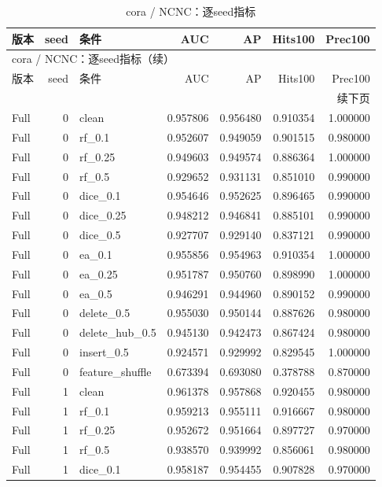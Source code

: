 \documentclass[UTF8,a4paper,11pt,fontset=fandol]{ctexart}
\begin{document}
{\footnotesize
\setlength{\tabcolsep}{3pt}
\begin{longtable}{lrlrrrr}
\caption{cora / NCNC：逐seed指标}\\
\toprule
版本 & seed & 条件 & AUC & AP & Hits100 & Prec100 \\
\midrule
\endfirsthead
\multicolumn{7}{l}{cora / NCNC：逐seed指标（续）}\\
\toprule
版本 & seed & 条件 & AUC & AP & Hits100 & Prec100 \\
\midrule
\endhead
\midrule\multicolumn{7}{r}{续下页}\\
\endfoot
\bottomrule\endlastfoot
Full & 0 & clean & 0.957806 & 0.956480 & 0.910354 & 1.000000 \\
Full & 0 & rf\_0.1 & 0.952607 & 0.949059 & 0.901515 & 0.980000 \\
Full & 0 & rf\_0.25 & 0.949603 & 0.949574 & 0.886364 & 1.000000 \\
Full & 0 & rf\_0.5 & 0.929652 & 0.931131 & 0.851010 & 0.990000 \\
Full & 0 & dice\_0.1 & 0.954646 & 0.952625 & 0.896465 & 0.990000 \\
Full & 0 & dice\_0.25 & 0.948212 & 0.946841 & 0.885101 & 0.990000 \\
Full & 0 & dice\_0.5 & 0.927707 & 0.929140 & 0.837121 & 0.990000 \\
Full & 0 & ea\_0.1 & 0.955856 & 0.954963 & 0.910354 & 1.000000 \\
Full & 0 & ea\_0.25 & 0.951787 & 0.950760 & 0.898990 & 1.000000 \\
Full & 0 & ea\_0.5 & 0.946291 & 0.944960 & 0.890152 & 0.990000 \\
Full & 0 & delete\_0.5 & 0.955030 & 0.950144 & 0.887626 & 0.980000 \\
Full & 0 & delete\_hub\_0.5 & 0.945130 & 0.942473 & 0.867424 & 0.980000 \\
Full & 0 & insert\_0.5 & 0.924571 & 0.929992 & 0.829545 & 1.000000 \\
Full & 0 & feature\_shuffle & 0.673394 & 0.693080 & 0.378788 & 0.870000 \\
Full & 1 & clean & 0.961378 & 0.957868 & 0.920455 & 0.980000 \\
Full & 1 & rf\_0.1 & 0.959213 & 0.955111 & 0.916667 & 0.980000 \\
Full & 1 & rf\_0.25 & 0.952672 & 0.951664 & 0.897727 & 0.970000 \\
Full & 1 & rf\_0.5 & 0.938570 & 0.939992 & 0.856061 & 0.980000 \\
Full & 1 & dice\_0.1 & 0.958187 & 0.954455 & 0.907828 & 0.970000 \\

\end{longtable}}
\end{document}
